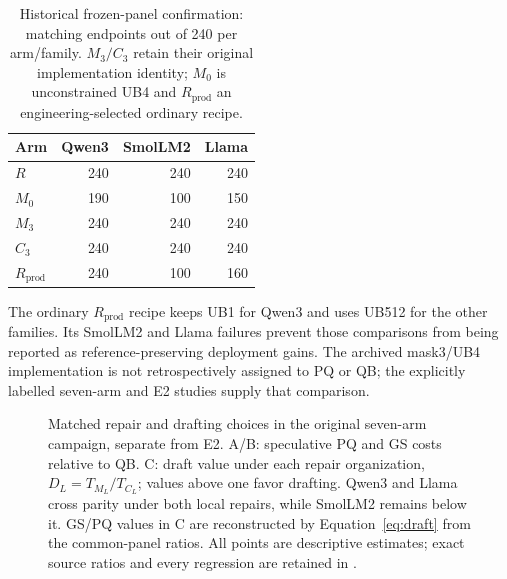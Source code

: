 \begin{table}[t]\centering\small
\caption{Historical frozen-panel confirmation: matching endpoints out of 240 per arm/family. $M_3/C_3$ retain their original implementation identity; $M_0$ is unconstrained UB4 and $R_{\mathrm{prod}}$ an engineering-selected ordinary recipe.}
\label{tab:qualification}
\begin{tabular}{lrrr}\toprule
Arm & Qwen3 & SmolLM2 & Llama\\\midrule
$R$ &240&240&240\\
$M_0$ &190&100&150\\
$M_3$ &240&240&240\\
$C_3$ &240&240&240\\
$R_{\mathrm{prod}}$ &240&100&160\\\bottomrule
\end{tabular}
\end{table}

The ordinary $R_{\mathrm{prod}}$ recipe keeps UB1 for Qwen3 and uses UB512 for the other families. Its SmolLM2 and Llama failures prevent those comparisons from being reported as reference-preserving deployment gains. The archived mask3/UB4 implementation is not retrospectively assigned to PQ or QB; the explicitly labelled seven-arm and E2 studies supply that comparison.

\begin{figure}[t]\centering
\resizebox{\textwidth}{!}{}
\caption{Matched repair and drafting choices in the original seven-arm campaign, separate from E2. A/B: speculative PQ and GS costs relative to QB. C: draft value under each repair organization, $D_L=T_{M_L}/T_{C_L}$; values above one favor drafting. Qwen3 and Llama cross parity under both local repairs, while SmolLM2 remains below it. GS/PQ values in C are reconstructed by Equation~\ref{eq:draft} from the common-panel ratios. All points are descriptive estimates; exact source ratios and every regression are retained in .}
\label{fig:cost}
\end{figure}

